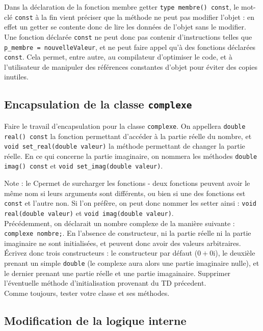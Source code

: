 \documentclass{book}
\newcommand{\inline}[1]{\texttt{#1}}
\newcommand{\cpp}{\mbox{C\vspace{.5em}\protect\raisebox{.2ex}{\footnotesize++~}}}
\begin{document}
Dans la déclaration de la fonction membre getter \inline{type membre() const}, le mot-clé \inline{const} à la fin vient préciser que la méthode ne peut pas modifier l'objet : en effet un getter se contente donc de lire les données de l'objet sans le modifier. Une fonction déclarée \inline{const} ne peut donc pas contenir d'instructions telles que \inline{p_membre = nouvelleValeur}, et ne peut faire appel qu'à des fonctions déclarées \inline{const}. Cela permet, entre autre, au compilateur d'optimiser le code, et à l'utilisateur de manipuler des références constantes d'objet pour éviter des copies inutiles.

\subsection{Encapsulation de la classe \texttt{complexe}}

Faire le travail d'encapsulation pour la classe \inline{complexe}. On appellera \inline{double real() const} la fonction permettant d'accéder à la partie réelle du nombre, et \inline{void set_real(double valeur)} la méthode permettant de changer la partie réelle. En ce qui concerne la partie imaginaire, on nommera les méthodes \inline{double imag() const} et \inline{void set_imag(double valeur)}.

Note : le \cpp permet de surcharger les fonctions - deux fonctions peuvent avoir le même nom si leurs arguments sont différents, ou bien si une des fonctions est \inline{const} et l'autre non. Si l'on préfère, on peut donc nommer les setter ainsi : \inline{void real(double valeur)} et \inline{void imag(double valeur)}.\\

Précédemment, on déclarait un nombre complexe de la manière suivante : \inline{complexe nombre;}. En l'absence de constructeur, ni la partie réelle ni la partie imaginaire ne sont initialisées, et peuvent donc avoir des valeurs arbitraires. Écrivez donc trois constructeurs : le constructeur par défaut ($0+0\mathrm{i}$), le deuxièle prenant un simple \inline{double} (le complexe aura alors une partie imaginaire nulle), et le dernier prenant une partie réelle et une partie imagainaire. Supprimer l'éventuelle méthode d'initialisation provenant du TD précedent.\\

Comme toujours, tester votre classe et ses méthodes.

\subsection{Modification de la logique interne}
\end{document}
